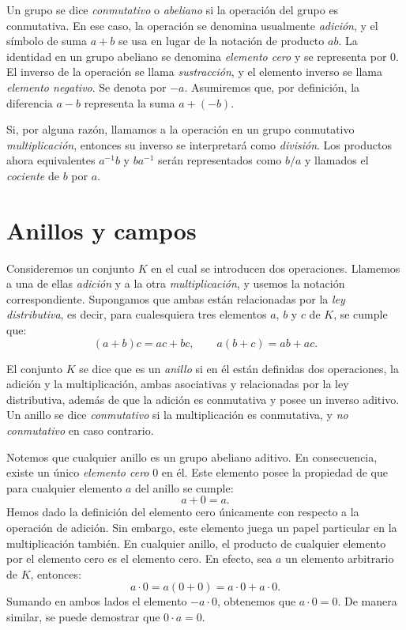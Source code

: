 Un grupo se dice \emph{conmutativo} o \emph{abeliano} si la operación del grupo es conmutativa. En ese caso, la operación se denomina usualmente \emph{adición}, y el símbolo de suma $a + b$ se usa en lugar de la notación de producto $ab$. La identidad en un grupo abeliano se denomina \emph{elemento cero} y se representa por $0$. El inverso de la operación se llama \emph{sustracción}, y el elemento inverso se llama \emph{elemento negativo}. Se denota por $-a$. Asumiremos que, por definición, la diferencia $a - b$ representa la suma $a + (-b)$.

Si, por alguna razón, llamamos a la operación en un grupo conmutativo \emph{multiplicación}, entonces su inverso se interpretará como \emph{división}. Los productos ahora equivalentes $a^{-1}b$ y $ba^{-1}$ serán representados como $b / a$ y llamados el \emph{cociente} de $b$ por $a$.

\section{Anillos y campos}

Consideremos un conjunto $K$ en el cual se introducen dos operaciones. Llamemos a una de ellas \emph{adición} y a la otra \emph{multiplicación}, y usemos la notación correspondiente. Supongamos que ambas están relacionadas por la \emph{ley distributiva}, es decir, para cualesquiera tres elementos $a$, $b$ y $c$ de $K$, se cumple que:
$$(a + b) c = ac + bc, \qquad a (b + c) = ab + ac.$$

\begin{definicion}{}{}
    El conjunto $K$ se dice que es un \emph{anillo} si en él están definidas dos operaciones, la adición y la multiplicación, ambas asociativas y relacionadas por la ley distributiva, además de que la adición es conmutativa y posee un inverso aditivo. Un anillo se dice \emph{conmutativo} si la multiplicación es conmutativa, y \emph{no conmutativo} en caso contrario.
\end{definicion}

Notemos que cualquier anillo es un grupo abeliano aditivo. En consecuencia, existe un único \textit{elemento cero} $0$ en él. Este elemento posee la propiedad de que para cualquier elemento $a$ del anillo se cumple:
$$a + 0 = a.$$
Hemos dado la definición del elemento cero únicamente con respecto a la operación de adición. Sin embargo, este elemento juega un papel particular en la multiplicación también. En cualquier anillo, el producto de cualquier elemento por el elemento cero es el elemento cero. En efecto, sea $a$ un elemento arbitrario de $K$, entonces:
$$a \cdot 0 = a (0 + 0) = a \cdot 0 + a \cdot 0.$$
Sumando en ambos lados el elemento $- a \cdot 0$, obtenemos que $a \cdot 0 = 0$. De manera similar, se puede demostrar que $0 \cdot a = 0$.

